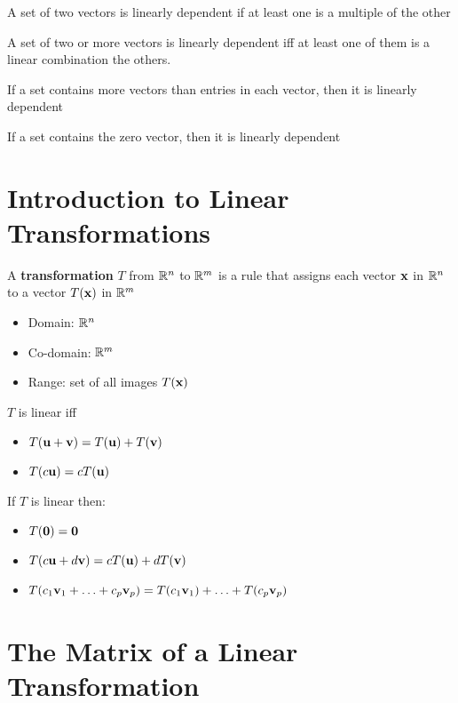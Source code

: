 \documentclass{report}
\begin{document}
A set of two vectors is linearly dependent if at least one is a multiple of the other

\begin{theorem}
    A set of two or more vectors is linearly dependent iff at least one of them is a linear combination the others.
\end{theorem}

\begin{theorem}
    If a set contains more vectors than entries in each vector, then it is linearly dependent 
\end{theorem}

\begin{theorem}
    If a set contains the zero vector, then it is linearly dependent 
\end{theorem}

\section{Introduction to Linear Transformations}

A \textbf{transformation} $T$ from $\mathbb{R}^n$ to $\mathbb{R}^m$ is a rule that assigns each vector $\mathbf{x}$ in 
$\mathbb{R}^n$ to a vector $T(\mathbf{x})$ in $\mathbb{R}^m$
\begin{itemize}
    \item Domain: $\mathbb{R}^n$
    \item Co-domain: $\mathbb{R}^m$
    \item Range: set of all images $T(\mathbf{x})$
\end{itemize}

\begin{definition}
    $T$ is linear iff \begin{itemize}
        \item $T(\mathbf{u} + \mathbf{v}) = T(\mathbf{u}) + T(\mathbf{v})$
        \item $T(c\mathbf{u}) = c T(\mathbf{u})$
    \end{itemize}
\end{definition}

If $T$ is linear then:
\begin{itemize}
    \item $T(\mathbf{0}) = \mathbf{0}$
    \item $T(c\mathbf{u} + d\mathbf{v}) = cT(\mathbf{u}) + dT(\mathbf{v})$
    \item $T(c_1\mathbf{v}_1 + \ldots + c_p\mathbf{v}_p) = T(c_1\mathbf{v}_1) + \ldots + T(c_p\mathbf{v}_p)$
\end{itemize}

\section{The Matrix of a Linear Transformation}
\end{document}
